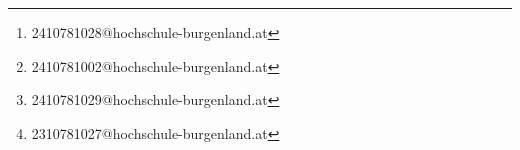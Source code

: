 \author{
  Harald Beier\thanks{2410781028@hochschule-burgenland.at} \and
  Susanne Peer\thanks{2410781002@hochschule-burgenland.at} \and
  Patrick Prugger\thanks{2410781029@hochschule-burgenland.at} \and
  Philipp Palatin\thanks{2310781027@hochschule-burgenland.at}
}